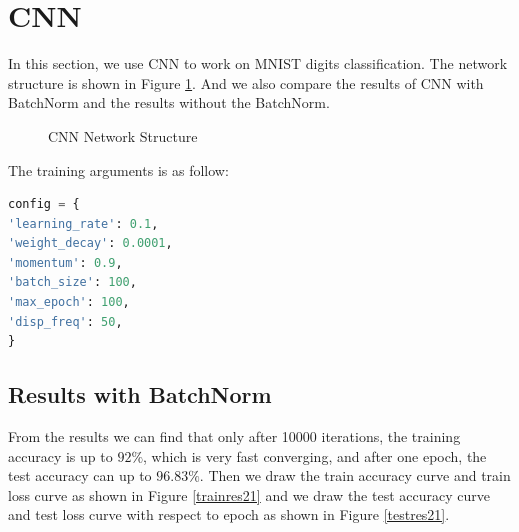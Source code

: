 \documentclass{elegantbook}
\begin{document}
\section{CNN}
In this section, we use CNN to work on MNIST digits classification. The network structure is shown in Figure \ref{fig2}. And we also compare the results of CNN with BatchNorm and the results without the BatchNorm.
\begin{figure}[htbp]
	\centering
	\caption{\label{fig2}CNN Network Structure}
\end{figure}

The training arguments is as follow:

\begin{lstlisting}[frame=single,language=python]  
config = {
'learning_rate': 0.1,
'weight_decay': 0.0001,
'momentum': 0.9,
'batch_size': 100,
'max_epoch': 100,
'disp_freq': 50,
}
\end{lstlisting}

\subsection{Results with BatchNorm}
From the results we can find that only after 10000 iterations, the training accuracy is up to $92\%$, which is very fast converging, and after one epoch, the test accuracy can up to $96.83\%$. Then we draw the train accuracy curve and train loss curve as shown in Figure \ref{trainres21} and we draw the test accuracy curve and test loss curve with respect to epoch as shown in Figure \ref{testres21}.
\end{document}
